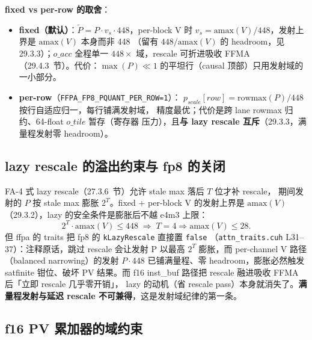 \textbf{fixed vs per-row 的取舍}：
\begin{itemize}[itemsep=1pt,topsep=2pt]
  \item \textbf{fixed（默认）}：$\tilde P = P\cdot v_s\cdot448$，per-block V 时
        $v_s=\mathrm{amax}(V)/448$，发射上界是 $\mathrm{amax}(V)$ 本身而非 448
        （留有 $448/\mathrm{amax}(V)$ 的 headroom，见 29.3.3）；$o\_acc$ 全程单一
        $448\times$ 域，rescale 可折进吸收 FFMA
        （29.4.3~节）。代价：$\max(P)\ll1$ 的平坦行（causal 顶部）只用发射域的
        一小部分。
  \item \textbf{per-row}（\texttt{FFPA\_FP8\_PQUANT\_PER\_ROW=1}）：
        $p_{scale}[row]=\mathrm{rowmax}(P)/448$ 按行自适应归一，每行铺满发射域，
        精度最优；代价是跨 lane rowmax 归约、64-float $o\_tile$ 暂存（寄存器
        压力），且\textbf{与 lazy rescale 互斥}（29.3.3，满量程发射零 headroom）。
\end{itemize}

\subsection{lazy rescale 的溢出约束与 fp8 的关闭}\label{sec:29-lazy}

FA-4 式 lazy rescale（27.3.6~节）允许 stale max 落后 $T$ 位才补 rescale，
期间发射的 $P$ 按 stale max 膨胀 $2^T$。fixed + per-block V 的发射上界是
$\mathrm{amax}(V)$（29.3.2），lazy 的安全条件是膨胀后不越 e4m3 上限：
\begin{equation}
  2^T\cdot\mathrm{amax}(V)\le448
  \;\Longrightarrow\;
  T=4\Rightarrow \mathrm{amax}(V)\le28 .
\end{equation}
但 ffpa 的 traits 把 fp8 的 \texttt{kLazyRescale} 直接置 \texttt{false}
（\texttt{attn\_traits.cuh} L31--37）：注释原话，跳过 rescale 会让发射 P
以最高 $2^T$ 膨胀，而 per-channel V 路径（balanced narrowing）的发射
$P\cdot448$ 已铺满量程、零 headroom，膨胀必然触发 satfinite 钳位、破坏 PV 结果。而 f16
inst\_buf 路径把 rescale 融进吸收 FFMA 后「立即 rescale 几乎零开销」，
lazy 的动机（省 rescale pass）本身就消失了。\textbf{满量程发射与延迟 rescale
不可兼得}，这是发射域纪律的第一条。

\subsection{f16 PV 累加器的域约束}\label{sec:29-f16acc}

